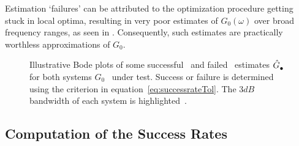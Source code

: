  Estimation `failures' can be attributed to the optimization procedure getting stuck in local optima, resulting in very poor estimates of $G_0(\omega)$ over broad frequency ranges, as seen in . 
 Consequently, such estimates are practically worthless approximations of $G_0$.


\begin{figure}
  \centering
  \setlength{\figurewidth}{0.8\columnwidth}
  \setlength{\figureheight}{0.6\figurewidth}
  
 \caption[Bodeplot of successful ad failed estimates.]{Illustrative Bode plots of some successful~ and failed~ estimates $\hat{G}_{\mathrm{\bullet}}^{\mathrm{}}$ for both systems $G_0$~ under test.
 Success or failure is determined using the criterion in equation~\eqref{eq:successrateTol}. The $3\unit{dB}$ bandwidth of each system is highlighted~.}
\label{fig:exampleFRF}
\end{figure}

\subsection{Computation of  the Success Rates}\label{se:CompuSR}

